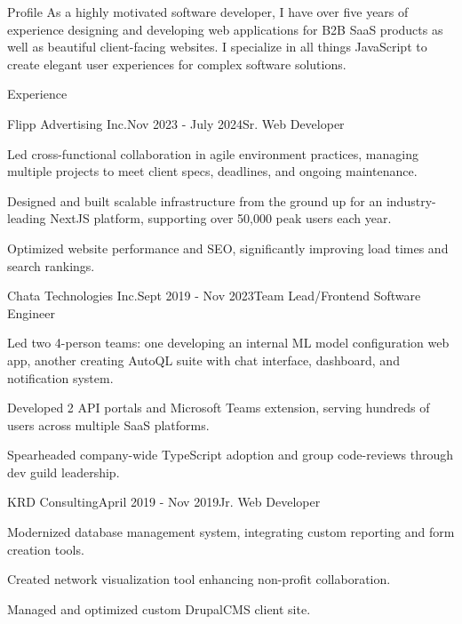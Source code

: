 \documentclass{resume}
\begin{document}
\begin{rSection}{Profile}
  As a highly motivated software developer, I have over five years of
  experience designing and developing web applications for B2B SaaS
  products as well as beautiful client-facing websites. I specialize in all things JavaScript to create elegant user
  experiences for complex software solutions.
\end{rSection}


\begin{rSection}{Experience}

    \begin{rSubsection}{Flipp Advertising Inc.}{Nov 2023 - July 2024}{Sr. Web Developer}{}
      \item Led cross-functional collaboration in agile environment practices, managing multiple projects to meet client specs, deadlines, and ongoing maintenance.
      \item Designed and built scalable infrastructure from the ground up for an industry-leading NextJS platform, supporting over 50,000 peak users each year.
      \item Optimized website performance and SEO, significantly improving load times and search rankings.
    \end{rSubsection}
    \begin{rSubsection}{Chata Technologies Inc.}{Sept 2019 - Nov 2023}{Team Lead/Frontend Software Engineer}{}
      \item Led two 4-person teams: one developing an internal ML model configuration web app, another creating AutoQL suite with chat interface, dashboard, and notification system.
      \item Developed 2 API portals and Microsoft Teams extension, serving hundreds of users across multiple SaaS platforms.
      \item Spearheaded company-wide TypeScript adoption and group code-reviews through dev guild leadership.
    \end{rSubsection}
    \begin{rSubsection}{KRD Consulting}{April 2019 - Nov 2019}{Jr. Web Developer}{}
      \item Modernized database management system, integrating custom reporting and form creation tools.
      \item Created network visualization tool enhancing non-profit collaboration.
      \item Managed and optimized custom DrupalCMS client site.
    \end{rSubsection}
    
\end{rSection}
\end{document}
